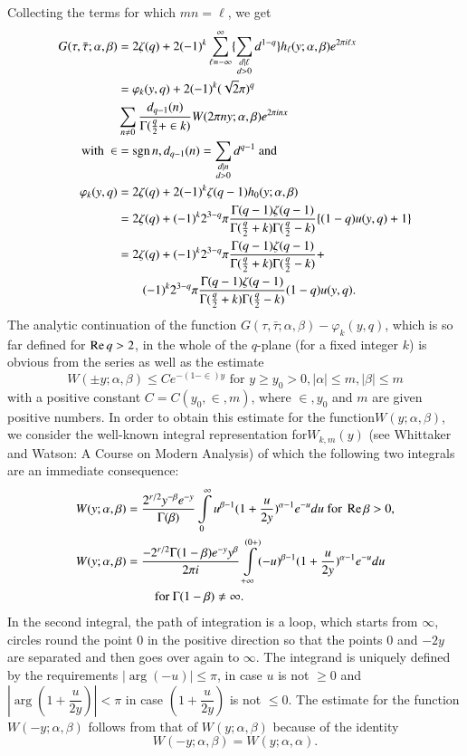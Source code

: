 Collecting the terms for which $mn=\ell$, we get 
\begin{align*}
G(\tau,\bar{\tau};\alpha,\beta) & = 2\zeta(q) + 2(-1)^k
\sum^{\infty}_{\ell=-\infty} \{\sum_{\substack{d|\ell\\d>0}} d^{1-q}\}
h_{\ell}(y;\alpha,\beta) e^{2\pi i \ell x}\\
& = \varphi_{k}(y,q) + 2(-1)^k (\sqrt{2}\pi)^q\\ 
&\sum_{n\neq 0}
\frac{d_{q-1}(n)}{\Gamma(\frac{q}{2}+\in k)} W(2\pi
ny;\alpha,\beta) e^{2\pi i nx}\\
\text{with } \in & = \operatorname{sgn} n, d_{q-1}(n) =
\sum_{\substack{d|n\\d>0}} d^{q-1} \text{ and } \\
\varphi_k(y,q) & = 2\zeta (q) + 2(-1)^k \zeta(q-1) h_0
(y;\alpha,\beta)\\
& = 2\zeta(q) + (-1)^k2^{3-q} \pi
\frac{\Gamma(q-1)\zeta(q-1)}{\Gamma(\frac{q}{2}+k)\Gamma(\frac{q}{2}-k)}
\{(1-q) u (y,q)+1\}\\
& = 2\zeta (q) + (-1)^k 2^{3-q}
\pi\frac{\Gamma(q-1)\zeta(q-1)}{\Gamma(\frac{q}{2}+k)
  \Gamma(\frac{q}{2}-k)} +\\
& \qquad (-1)^k 2^{3-q} \pi
\frac{\Gamma(q-1)\zeta(q-1)}{\Gamma(\frac{q}{2}+k)
  \Gamma(\frac{q}{2}-k)} (1-q)u(y,q).
\end{align*}
The \pageoriginale analytic continuation of the function
$G(\tau,\bar{\tau};\alpha,\beta)-\varphi_k (y,q)$, which is so far
defined for $\operatorname{Re} q>2$, in the whole of the $q$-plane (for a fixed
integer $k$) is obvious from the series as well as the estimate 
$$
W(\pm y;\alpha,\beta) \leq C e^{-(1-\in)y} \text{ for } y \geq
y_0 >0, |\alpha| \leq m, |\beta| \leq m
$$
with a positive constant $C=C(y_0,\in, m)$, where
$\in, y_0$ and $m$ are given positive numbers. In order to
obtain this estimate for the function\break $W(y;\alpha,\beta)$, we consider
the well-known integral representation for\break $W_{k,m}(y)$ (see Whittaker
and Watson: A Course on Modern Analysis) of which the following two
integrals are an immediate consequence:
\begin{align*}
W(y;\alpha,\beta) & = \frac{2^{r/2}y^{-\beta} e^{-y}}{\Gamma(\beta)}
\int\limits^{\infty}_0 u^{\beta-1} (1+\frac{u}{2y})^{\alpha-1} e^{-u}
 du \text{ for } \operatorname{Re} \beta >0,\\
W(y;\alpha,\beta) & =
\frac{-2^{r/2}\Gamma(1-\beta)e^{-y}y^{\beta}}{2\pi i}
\int\limits^{(0+)}_{+\infty} (-u)^{\beta-1}
(1+\frac{u}{2y})^{\alpha-1} e^{-u} du\\
&\qquad \text{ for } \Gamma(1-\beta)
\neq \infty.
\end{align*}
In the second integral, the path of integration is a loop, which
starts from $\infty$, circles round the point 0 in the positive
direction so that the points 0 and $-2y$ are separated and then goes
over again to $\infty$. The integrand is uniquely defined by the
requirements $|\arg(-u)|\leq \pi$, in case $u$ is not $\geq 0$ and
$|\arg(1+\dfrac{u}{2y})|< \pi$ in case $(1+\dfrac{u}{2y})$ is not
$\leq 0$. The estimate for the function $W(-y;\alpha, \beta)$ follows
from that of $W(y;\alpha,\beta)$ because of the identity
$$
W(-y;\alpha,\beta) =W(y;\alpha,\alpha).
$$

